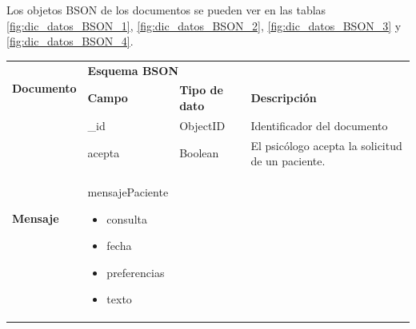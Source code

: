 Los objetos BSON de los documentos se pueden ver en las tablas \ref{fig:dic_datos_BSON_1},  \ref{fig:dic_datos_BSON_2}, \ref{fig:dic_datos_BSON_3} y \ref{fig:dic_datos_BSON_4}.

\begin{table}[htpb]
\centering
\begin{tabularx}{\textwidth}{|l|X|X|X|}
\hline
\multirow{2}{*}{\textbf{Documento}} & \multicolumn{3}{l|}{\textbf{Esquema BSON}}                                                                                                                                                                                                                                                                                                                               \\ \cline{2-4} 
                                    & \textbf{Campo}                                        & \textbf{Tipo de dato}                    & \textbf{Descripción}                                                                                                                                                                                                                                                  \\ \hline
\multirow{7}{*}{\textbf{Mensaje}}   & \_id                                                  & ObjectID                                 & Identificador del documento                                                                                                                                                                                                                                           \\ \cline{2-4} 
                                    & acepta                                                & Boolean                                  & El psicólogo acepta la solicitud de un paciente.                                                                                                                                                                                                                      \\ \cline{2-4} 
                                    & mensajePaciente \begin{itemize}
                                    \item consulta
                                    \item fecha
                                    \item preferencias
                                    \item texto

\end{itemize}
\end{tabularx}
\end{table}
